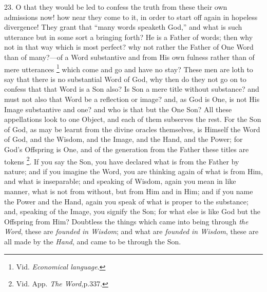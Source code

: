 23. O that they would be led
to confess the truth from these their own admissions now! how near
they come to it, in order to start off again in hopeless divergence!
They grant that ``many words speaketh God,'' and what is such utterance
but in some sort a bringing forth? He is a Father of words; then why
not in that way which is most perfect? why not rather the Father of
One Word than of many?—of a Word substantive and from His own
fulness rather than of mere utterances \footnote{\emph{}Vid. \emph{Economical language}.} which come and go and have no stay? These men are loth to say
that there is no substantial Word of God, why then do they not go on
to confess that that Word is a Son also? Is Son a mere title without
substance? and must not also that Word be a reflection or image? and,
as God is One, is not His Image substantive and one? and who is that
but the One Son? All these appellations look to one Object, and each
of them subserves the rest. For the Son of God, as may be learnt from
the divine oracles themselves, is Himself the Word of God, and the
Wisdom, and the Image, and the Hand, and the Power; for God's
Offspring is One, and of the generation from the Father these titles
are tokens \footnote{\emph{}Vid. App. \emph{The Word,}p.\emph{}337.}. If you say
the Son, you have declared what is from the Father by nature; and if
you imagine the Word, you are thinking again of what is from Him,
and what is inseparable; and speaking of Wisdom, again you mean in
like manner, what is not from without, but from Him and in Him; and if
you name the Power and the Hand, again you speak of what is proper to
the substance; and, speaking of the Image, you signify the Son; for
what else is like God but the Offspring from Him? Doubtless the things
which came into being through \emph{the Word}, these are \emph{founded in
Wisdom}; and what are \emph{founded in Wisdom}, these are all made
by the \emph{Hand}, and came to be through the Son.

